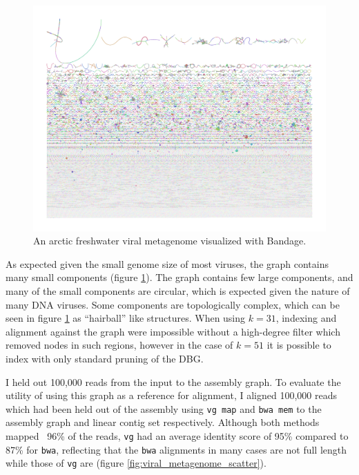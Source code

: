 \begin{figure}[htbp!]
  \centering
  \includegraphics[width=1.0\textwidth]{Chapter3/Figs/svalbard_metagenome_minia_k51_m3_contigs_gfa.png}
  \caption[An arctic freshwater viral metagenome]{
    An arctic freshwater viral metagenome visualized with Bandage.
  }
  \label{fig:viral_metagenome_bandage}
\end{figure}

As expected given the small genome size of most viruses, the graph contains many small components (figure \ref{fig:viral_metagenome_bandage}).
The graph contains few large components, and many of the small components are circular, which is expected given the nature of many DNA viruses.
Some components are topologically complex, which can be seen in figure \ref{fig:viral_metagenome_bandage} as ``hairball'' like structures.
When using $k=31$, indexing and alignment against the graph were impossible without a high-degree filter which removed nodes in such regions, however in the case of $k=51$ it is possible to index with only standard pruning of the DBG.

I held out 100,000 reads from the input to the assembly graph.
To evaluate the utility of using this graph as a reference for alignment, I aligned 100,000 reads which had been held out of the assembly using {\tt vg map} and {\tt bwa mem} to the assembly graph and linear contig set respectively.
Although both methods mapped ~96\% of the reads, {\tt vg} had an average identity score of 95\% compared to 87\% for {\tt bwa}, reflecting that the {\tt bwa} alignments in many cases are not full length while those of {\tt vg} are (figure \ref{fig:viral_metagenome_scatter}).

